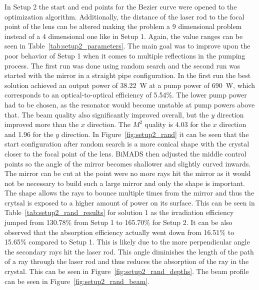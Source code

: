 \documentclass[a4paper,10pt]{article}
\newcommand{\figref}[1]{Figure~\ref{#1}}
\newcommand{\tabref}[1]{Table~\ref{#1}}
\begin{document}
    In Setup 2 the start and end points for the Bezier curve were opened
    to the optimization algorithm.
    Additionally, the distance of the laser rod to the focal point of the
    lens can be altered making the problem a 9 dimensional problem instead
    of a 4 dimensional one like in Setup 1.
    Again, the value ranges can be seen in \tabref{tab:setup2_parameters}.
    The main goal was to improve upon the poor behavior of Setup 1 when
    it comes to multiple reflections in the pumping process.
    The first run was done using random search and the second run was
    started with the mirror in a straight pipe configuration.
    In the first run the best solution achieved an output power
    of \SI{38.22}{W} at a pump power of \SI{690}{W}, which corresponds
    to an optical-to-optical efficiency of 5.54\%.
    The lower pump power had to be chosen, as the resonator would become
    unstable at pump powers above that.
    The beam quality also significantly improved overall, but the $y$
    direction improved more than the $x$ direction.
    The $M^2$ quality is 4.03 for the $x$ direction and 1.96 for the
    $y$ direction.
    In \figref{fig:setup2_rand} it can be seen that the start configuration
    after random search is a more conical shape with the crystal closer
    to the focal point of the lens.
    BiMADS then adjusted the middle control points so the angle of the
    mirror becomes shallower and slightly curved inwards.
    The mirror can be cut at the point were no more rays hit the mirror
    as it would not be necessary to build such a large mirror and only
    the shape is important.
    The shape allows the rays to bounce multiple times from the mirror
    and thus the crytsal is exposed to a higher amount of power on its
    surface.
    This can be seen in \tabref{tab:setup2_rand_results} for solution 1
    as the irradiation efficiency jumped from 130.78\% from Setup 1
    to 165.70\% for Setup 2.
    It can be also observed that the absorption efficiency actually
    went down from 16.51\% to 15.65\% compared to Setup 1.
    This is likely due to the more perpendicular angle the secondary
    rays hit the laser rod.
    This angle diminishes the length of the path of a ray through the
    laser rod and thus reduces the absorption of the ray in the crystal.
    This can be seen in \figref{fig:setup2_rand_depths}.
    The beam profile can be seen in \figref{fig:setup2_rand_beam}.
\end{document}
